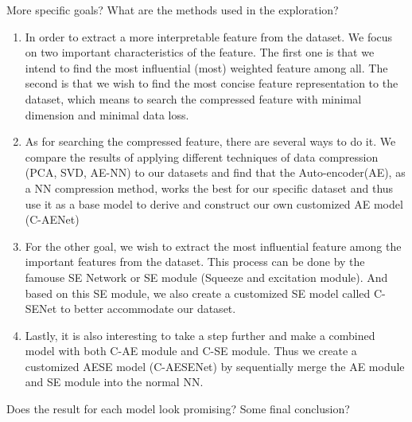 \documentclass[12pt]{article}
\numberwithin{equation}{section}
\newenvironment{theo}[2][]{\begin{box_for_theo}[#1]{#2}}{\end{box_for_theo}}
\newenvironment{proof}{\begin{box_for_proof}}{\end{box_for_proof}}
\begin{document}
\vspace{10mm}

\begin{theo}[title=Question 2]{}
	More specific goals? What are the methods used in the exploration?
\end{theo}

\vspace{10mm}

\begin{proof}
	\begin{enumerate}
		\item In order to extract a more interpretable feature from the dataset. We focus on two important characteristics of the feature. The first one is that we intend to find the most influential (most) weighted feature among all. The second is that we wish to find the most concise feature representation to the dataset, which means to search the compressed feature with minimal dimension and minimal data loss.
		\item As for searching the compressed feature, there are several ways to do it. We compare the results of applying different techniques of data compression (PCA, SVD, AE-NN) to our datasets and find that the Auto-encoder(AE), as a NN compression method, works the best for our specific dataset and thus use it as a base model to derive and construct our own customized AE model (C-AENet)
		\item For the other goal, we wish to extract the most influential feature among the important features from the dataset. This process can be done by the famouse SE Network or SE module (Squeeze and excitation module). And based on this SE module, we also create a customized SE model called C-SENet to better accommodate our dataset.
		\item Lastly, it is also interesting to take a step further and make a combined model with both C-AE module and C-SE module. Thus we create a customized AESE model (C-AESENet) by sequentially merge the AE module and SE module into the normal NN.
	\end{enumerate}
	
\end{proof}

\vspace{10mm}

\begin{theo}[title=Question 3]{}
	Does the result for each model look promising? Some final conclusion? 
\end{theo}
\end{document}
